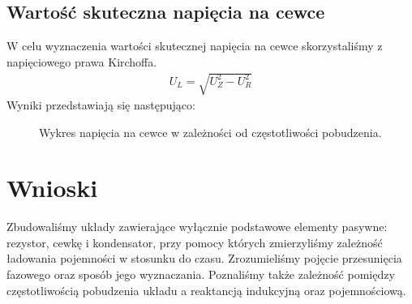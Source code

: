 \documentclass[polish,polish,a4paper]{article}
\begin{document}
\subsection{Wartość skuteczna napięcia na cewce}
W celu wyznaczenia wartości skutecznej napięcia na cewce skorzystaliśmy z napięciowego prawa Kirchoffa. \cite{mieczyslaw}
\begin{gather}
U_L = \sqrt{U_Z^2 - U_R^2}
\end{gather}
Wyniki przedstawiają się następująco:
\begin{figure}[H]
\centering
{}
\caption{Wykres napięcia na cewce w zależności od częstotliwości pobudzenia.}
\end{figure}

\newpage
\section{Wnioski}

Zbudowaliśmy układy zawierające wyłącznie podstawowe elementy pasywne: rezystor, cewkę i kondensator, przy pomocy których zmierzyliśmy zależność ładowania pojemności w stosunku do czasu.
Zrozumieliśmy pojęcie przesunięcia fazowego oraz sposób jego wyznaczania. Poznaliśmy także zależność pomiędzy częstotliwością pobudzenia układu a reaktancją indukcyjną oraz pojemnościową.

\tableofcontents



\end{document}
